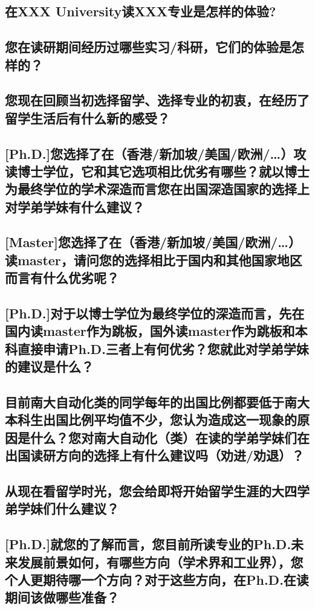\documentclass[a4paper,UTF8]{book}
\begin{document}
\subsection*{在XXX University读XXX专业是怎样的体验?}

\subsection*{您在读研期间经历过哪些实习/科研，它们的体验是怎样的？}

\subsection*{您现在回顾当初选择留学、选择专业的初衷，在经历了留学生活后有什么新的感受？}

\subsection*{[Ph.D.]您选择了在（香港/新加坡/美国/欧洲/…）攻读博士学位，它和其它选项相比优劣有哪些？就以博士为最终学位的学术深造而言您在出国深造国家的选择上对学弟学妹有什么建议？}

\subsection*{[Master]您选择了在（香港/新加坡/美国/欧洲/…）读master，请问您的选择相比于国内和其他国家地区而言有什么优劣呢？}

\subsection*{[Ph.D.]对于以博士学位为最终学位的深造而言，先在国内读master作为跳板，国外读master作为跳板和本科直接申请Ph.D.三者上有何优劣？您就此对学弟学妹的建议是什么？}

\subsection*{目前南大自动化类的同学每年的出国比例都要低于南大本科生出国比例平均值不少，您认为造成这一现象的原因是什么？您对南大自动化（类）在读的学弟学妹们在出国读研方向的选择上有什么建议吗（劝进/劝退）？}

\subsection*{从现在看留学时光，您会给即将开始留学生涯的大四学弟学妹们什么建议？}

\subsection*{[Ph.D.]就您的了解而言，您目前所读专业的Ph.D.未来发展前景如何，有哪些方向（学术界和工业界），您个人更期待哪一个方向？对于这些方向，在Ph.D.在读期间该做哪些准备？}
\end{document}
